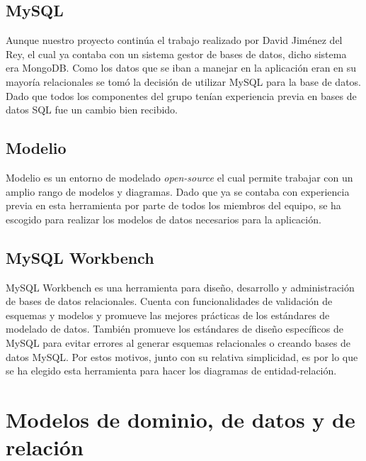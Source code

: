 \documentclass[11pt]{book}
\begin{document}
	\section{MySQL}
	Aunque nuestro proyecto continúa el trabajo realizado por David Jiménez del Rey, el cual ya contaba con un sistema gestor de bases de datos, dicho sistema era MongoDB. Como los datos que se iban a manejar en la aplicación eran en su mayoría relacionales se tomó la decisión de utilizar MySQL para la base de datos. Dado que todos los componentes del grupo tenían experiencia previa en bases de datos SQL fue un cambio bien recibido.
	
	\section{Modelio}	
	Modelio es un entorno de modelado \emph{open-source} el cual permite trabajar con un amplio rango de modelos y diagramas. Dado que ya se contaba con experiencia previa en esta herramienta por parte de todos los miembros del equipo, se ha escogido para realizar los modelos de datos necesarios para la aplicación.
	
	\section{MySQL Workbench}
	MySQL Workbench es una herramienta para diseño, desarrollo y administración de bases de datos relacionales. 
	Cuenta con funcionalidades de validación de esquemas y modelos y promueve las mejores prácticas de los estándares de modelado de datos. También promueve los estándares de diseño específicos de MySQL para evitar errores al generar esquemas relacionales o creando bases de datos MySQL. Por estos motivos, junto con su relativa simplicidad, es por lo que se ha elegido esta herramienta para hacer los diagramas de entidad-relación.
	
	
	\chapter{Modelos de dominio, de datos y de relación}\label{cap:modelos}
	
\end{document}
